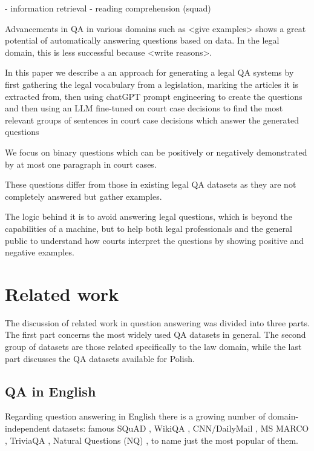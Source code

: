 \documentclass{IOS-Book-Article}
\begin{document}
- information retrieval
- reading comprehension (squad)

Advancements in QA in various domains such as <give examples> shows a great potential of automatically answering questions based on data. In the legal domain, this is less successful because <write reasons>.

In this paper we describe a an approach for generating a legal QA systems by first gathering the legal vocabulary from a legislation, marking the articles it is extracted from, then using chatGPT prompt engineering to create the questions and then using an LLM fine-tuned on court case decisions to find the most relevant groups of sentences in court case decisions which answer the generated questions

We focus on binary questions which can be positively or negatively demonstrated by at most one paragraph in court cases. 

These questions differ from those in existing legal QA datasets as they are not completely answered but gather examples.

The logic behind it is to avoid answering legal questions, which is beyond the capabilities of a machine, but to help both legal professionals and the general public to understand how courts interpret the questions by showing positive and negative examples.



\section{Related work}

The discussion of related work in question answering was divided into three parts. The first part concerns the most widely
used QA datasets in general. The second group of datasets are those related specifically to the law domain, while
the last part discusses the QA datasets available for Polish.



\subsection{QA in English}

Regarding question answering in English there is a growing number of domain-independent datasets: famous SQuAD
\cite{rajpurkar2016squad}, WikiQA \cite{yang2015wikiqa}, CNN/DailyMail \cite{hermann2015teaching}, MS MARCO
\cite{bajaj2016ms}, TriviaQA \cite{joshi2017triviaqa}, Natural Questions (NQ) \cite{kwiatkowski2019natural}, to name just
the most popular of them.
\end{document}
